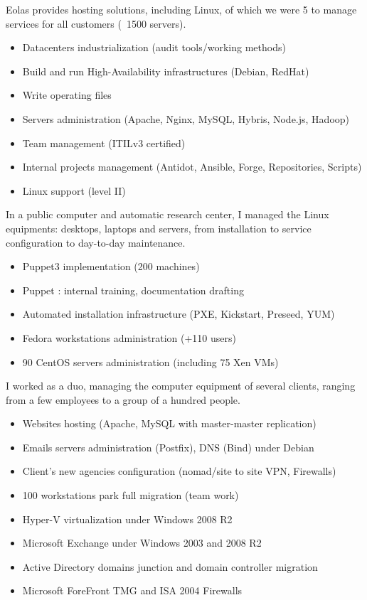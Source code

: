 \documentclass[12pt,a4paper,roman]{moderncv}          %
\begin{document}
{Eolas provides hosting solutions, including Linux, of which we were 5 to manage services for all customers (~1500 servers).
\begin{itemize}
  \item Datacenters industrialization (audit tools/working methods)
  \item Build and run High-Availability infrastructures (Debian, RedHat)
  \item Write operating files
  \item Servers administration (Apache, Nginx, MySQL, Hybris, Node.js, Hadoop)
  \item Team management (ITILv3 certified)
  \item Internal projects management (Antidot, Ansible, Forge, Repositories, Scripts)
  \item Linux support (level II)
\end{itemize}}


{In a public computer and automatic research center, I managed the Linux equipments: desktops, laptops and servers, from installation to service configuration to day-to-day maintenance.
\begin{itemize}
  \item Puppet3 implementation (200 machines)
  \item Puppet : internal training, documentation drafting
  \item Automated installation infrastructure (PXE, Kickstart, Preseed, YUM)
  \item Fedora workstations administration (+110 users)
  \item 90 CentOS servers administration (including 75 Xen VMs)
\end{itemize}}


{I worked as a duo, managing the computer equipment of several clients, ranging from a few employees to a group of a hundred people.
\begin{itemize}
  \item Websites hosting (Apache, MySQL with master-master replication)
  \item Emails servers administration (Postfix), DNS (Bind) under Debian
  \item Client's new agencies configuration (nomad/site to site VPN, Firewalls)
  \item 100 workstations park full migration (team work)
  \item Hyper-V virtualization under Windows 2008 R2
  \item Microsoft Exchange under Windows 2003 and 2008 R2
  \item Active Directory domains junction and domain controller migration
  \item Microsoft ForeFront TMG and ISA 2004 Firewalls
\end{itemize}}
\end{document}
